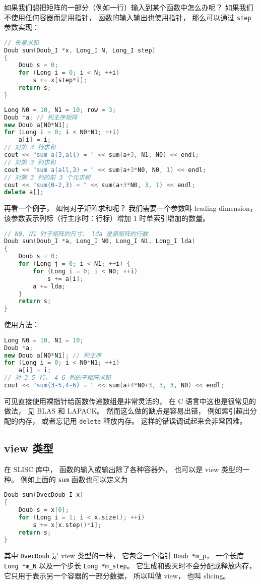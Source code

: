 
\begin{issues}
\issueDraft
\end{issues}


如果我们想把矩阵的一部分（例如一行）输入到某个函数中怎么办呢？ 如果我们不使用任何容器而是用指针， 函数的输入输出也使用指针， 那么可以通过 \verb|step| 参数实现：
\begin{lstlisting}[language=cpp]
// 矢量求和
Doub sum(Doub_I *x, Long_I N, Long_I step)
{
    Doub s = 0;
    for (Long i = 0; i < N; ++i)
        s += x[step*i];
    return s;
}
\end{lstlisting}

\begin{lstlisting}[language=cpp]
Long N0 = 10, N1 = 10; row = 3;
Doub *a; // 列主序矩阵
new Doub a[N0*N1];
for (Long i = 0; i < N0*N1; ++i)
    a[i] = i;
// 对第 3 行求和
cout << "sum a(3,all) = " << sum(a+3, N1, N0) << endl;
// 对第 3 列求和
cout << "sum a(all,3) = " << sum(a+3*N0, N0, 1) << endl;
// 对第 3 列的前 3 个元求和
cout << "sum(0-2,3) = " << sum(a+3*N0, 3, 1) << endl;
delete a[];
\end{lstlisting}
再看一个例子， 如何对子矩阵求和呢？ 我们需要一个参数叫 leading dimension， 该参数表示列标（行主序时：行标）增加 1 时单索引增加的数量。
\begin{lstlisting}[language=cpp]
// N0, N1 时子矩阵的尺寸， lda 是原矩阵的行数
Doub sum(Doub_I *a, Long_I N0, Long_I N1, Long_I lda)
{
    Doub s = 0;
    for (Long j = 0; i < N1; ++i) {
        for (Long i = 0; i < N0; ++i)
            s += a[i];
        a += lda;
    }
    return s;
}
\end{lstlisting}
使用方法：
\begin{lstlisting}[language=cpp]
Long N0 = 10, N1 = 10;
Doub *a;
new Doub a[N0*N1]; // 列主序
for (Long i = 0; i < N0*N1; ++i)
    a[i] = i;
// 对 3-5 行， 4-6 列的子矩阵求和
cout << "sum(3-5,4-6) = " << sum(a+4*N0+3, 3, 3, N0) << endl;
\end{lstlisting}
可见直接使用裸指针给函数传递数组是非常灵活的， 在 C 语言中这也是很常见的做法， 见 BLAS 和 LAPACK。 然而这么做的缺点是容易出错， 例如索引超出分配的内存， 或者忘记用 \verb|delete| 释放内存。 这样的错误调试起来会非常困难。

\subsection{view 类型}
在 SLISC 库中， 函数的输入或输出除了各种容器外， 也可以是 view 类型的一种。 例如上面的 \verb|sum| 函数也可以定义为
\begin{lstlisting}[language=cpp]
Doub sum(DvecDoub_I x)
{
    Doub s = x[0];
    for (Long i = 1; i < x.size(); ++i)
        s += x[x.step()*i];
    return s;
}
\end{lstlisting}
其中 \verb|DvecDoub| 是 view 类型的一种， 它包含一个指针 \verb|Doub *m_p|， 一个长度 \verb|Long *m_N| 以及一个步长 \verb|Long *m_step|。 它生成和毁灭时不会分配或释放内存， 它只用于表示另一个容器的一部分数据， 所以叫做 view， 也叫 slicing。

